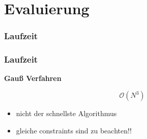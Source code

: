 \section{Evaluierung}

\subsubsection{Laufzeit}
\begin{frame}
    \frametitle{Laufzeit}

    \textbf{Gauß Verfahren}

    $$ \mathcal{O}( N^3 ) $$

    \begin{itemize}
        \item nicht der schnellste Algorithmus
        \item gleiche constraints sind zu beachten!! 
    \end{itemize}

\end{frame}


